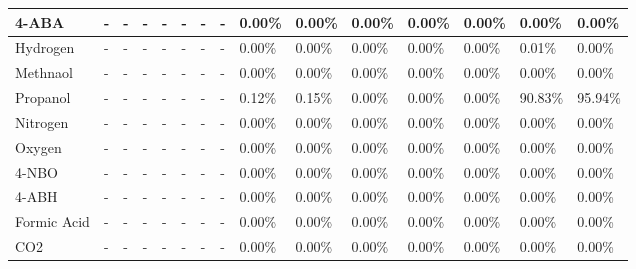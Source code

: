 \begin{landscape}
\begin{table}[H]
\begin{tabular}{|l|l|l|l|l|l|l|l|l|l|l|l|l|l|l|}
4-ABA                   & -    & -    & -    & -    & -    & -    & -    & 0.00\%  & 0.00\%  & 0.00\%  & 0.00\%  & 0.00\%  & 0.00\%  & 0.00\%  \\ \hline
Hydrogen                & -    & -    & -    & -    & -    & -    & -    & 0.00\%  & 0.00\%  & 0.00\%  & 0.00\%  & 0.00\%  & 0.01\%  & 0.00\%  \\ \hline
Methnaol                & -    & -    & -    & -    & -    & -    & -    & 0.00\%  & 0.00\%  & 0.00\%  & 0.00\%  & 0.00\%  & 0.00\%  & 0.00\%  \\ \hline
Propanol                & -    & -    & -    & -    & -    & -    & -    & 0.12\%  & 0.15\%  & 0.00\%  & 0.00\%  & 0.00\%  & 90.83\% & 95.94\% \\ \hline
Nitrogen                & -    & -    & -    & -    & -    & -    & -    & 0.00\%  & 0.00\%  & 0.00\%  & 0.00\%  & 0.00\%  & 0.00\%  & 0.00\%  \\ \hline
Oxygen                  & -    & -    & -    & -    & -    & -    & -    & 0.00\%  & 0.00\%  & 0.00\%  & 0.00\%  & 0.00\%  & 0.00\%  & 0.00\%  \\ \hline
4-NBO                   & -    & -    & -    & -    & -    & -    & -    & 0.00\%  & 0.00\%  & 0.00\%  & 0.00\%  & 0.00\%  & 0.00\%  & 0.00\%  \\ \hline
4-ABH                   & -    & -    & -    & -    & -    & -    & -    & 0.00\%  & 0.00\%  & 0.00\%  & 0.00\%  & 0.00\%  & 0.00\%  & 0.00\%  \\ \hline
Formic Acid             & -    & -    & -    & -    & -    & -    & -    & 0.00\%  & 0.00\%  & 0.00\%  & 0.00\%  & 0.00\%  & 0.00\%  & 0.00\%  \\ \hline
CO2                     & -    & -    & -    & -    & -    & -    & -    & 0.00\%  & 0.00\%  & 0.00\%  & 0.00\%  & 0.00\%  & 0.00\%  & 0.00\%  \\ \hline
\end{tabular}
\end{table}


\end{landscape}
